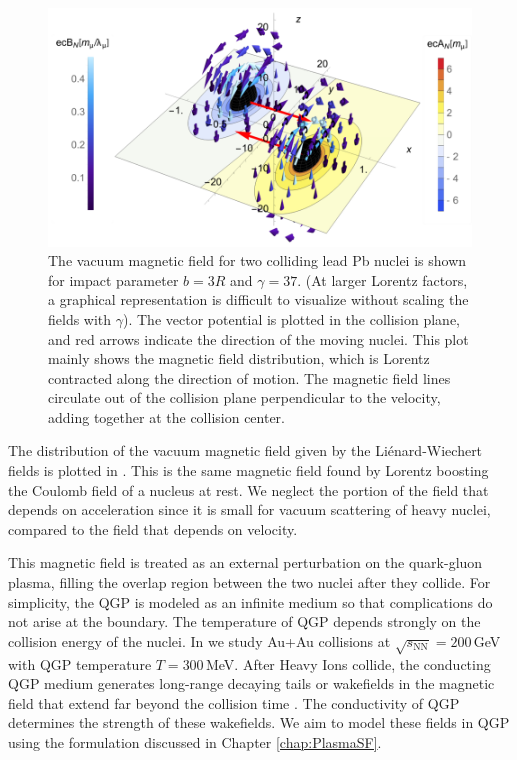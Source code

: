\begin{figure}[ht]
    \centering
    \includegraphics[width=0.85\linewidth]{plots/chap02QCD/Bfield.png}
    \caption{The vacuum magnetic field for two colliding lead Pb nuclei is shown for impact parameter $b=3R$ and $\gamma =37$. (At larger Lorentz factors, a graphical representation is difficult to visualize without scaling the fields with $\gamma$). The vector potential is plotted in the collision plane, and red arrows indicate the direction of the moving nuclei. This plot mainly shows the magnetic field distribution, which is Lorentz contracted along the direction of motion. The magnetic field lines circulate out of the collision plane perpendicular to the velocity, adding together at the collision center.  }
    \label{fig:vacmag}
\end{figure}

The distribution of the vacuum magnetic field given by the Li\'enard-Wiechert fields is plotted in . This is the same magnetic field found by Lorentz boosting the Coulomb field of a nucleus at rest. We neglect the portion of the field that depends on acceleration since it is small for vacuum scattering of heavy nuclei, compared to the field that depends on velocity.

This magnetic field is treated as an external perturbation on the quark-gluon plasma, filling the overlap region between the two nuclei after they collide. For simplicity, the QGP is modeled as an infinite medium so that complications do not arise at the boundary. The temperature of QGP depends strongly on the collision energy of the nuclei. In \cite{Grayson:2022asf} we study Au+Au collisions at $\sqrt{s_{\text{NN}}}=200\,$GeV with QGP temperature $T=300$\,MeV.  After Heavy Ions collide, the conducting QGP medium generates long-range decaying tails or wakefields in the magnetic field that extend far beyond the collision time \cite{Tuchin:2010vs}. The conductivity of QGP determines the strength of these wakefields. We aim to model these fields in QGP using the formulation discussed in Chapter \ref{chap:PlasmaSF}.

